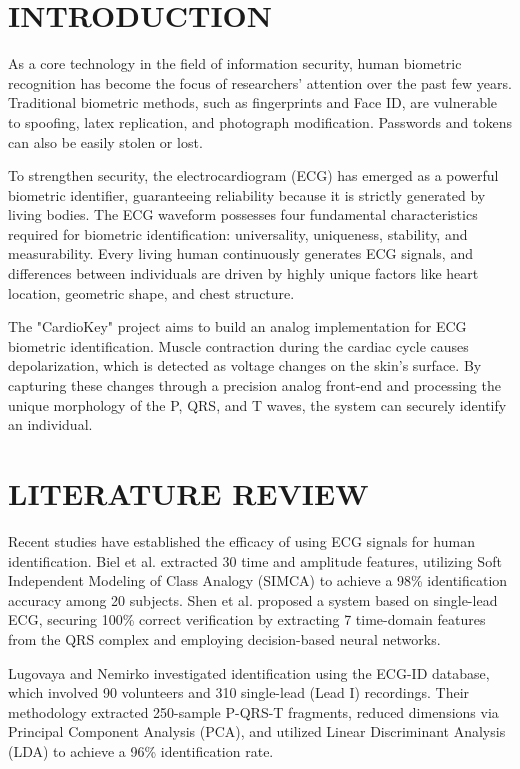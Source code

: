\documentclass[12pt,a4paper]{report}
\begin{document}
\chapter{INTRODUCTION}
As a core technology in the field of information security, human biometric recognition has become the focus of researchers' attention over the past few years. Traditional biometric methods, such as fingerprints and Face ID, are vulnerable to spoofing, latex replication, and photograph modification. Passwords and tokens can also be easily stolen or lost. 

To strengthen security, the electrocardiogram (ECG) has emerged as a powerful biometric identifier, guaranteeing reliability because it is strictly generated by living bodies. The ECG waveform possesses four fundamental characteristics required for biometric identification: universality, uniqueness, stability, and measurability. Every living human continuously generates ECG signals, and differences between individuals are driven by highly unique factors like heart location, geometric shape, and chest structure. 

The "CardioKey" project aims to build an analog implementation for ECG biometric identification. Muscle contraction during the cardiac cycle causes depolarization, which is detected as voltage changes on the skin's surface. By capturing these changes through a precision analog front-end and processing the unique morphology of the P, QRS, and T waves, the system can securely identify an individual.

\chapter{LITERATURE REVIEW}
Recent studies have established the efficacy of using ECG signals for human identification. Biel et al. extracted 30 time and amplitude features, utilizing Soft Independent Modeling of Class Analogy (SIMCA) to achieve a 98\% identification accuracy among 20 subjects. Shen et al. proposed a system based on single-lead ECG, securing 100\% correct verification by extracting 7 time-domain features from the QRS complex and employing decision-based neural networks.

Lugovaya and Nemirko investigated identification using the ECG-ID database, which involved 90 volunteers and 310 single-lead (Lead I) recordings. Their methodology extracted 250-sample P-QRS-T fragments, reduced dimensions via Principal Component Analysis (PCA), and utilized Linear Discriminant Analysis (LDA) to achieve a 96\% identification rate.
\end{document}
